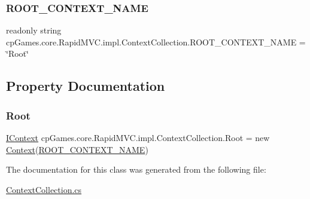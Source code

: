 \subsubsection{\texorpdfstring{ROOT\_CONTEXT\_NAME}{ROOT\_CONTEXT\_NAME}}
{\footnotesize\ttfamily readonly string cp\+Games.\+core.\+Rapid\+M\+V\+C.\+impl.\+Context\+Collection.\+R\+O\+O\+T\+\_\+\+C\+O\+N\+T\+E\+X\+T\+\_\+\+N\+A\+ME = \char`\"{}Root\char`\"{}\hspace{0.3cm}{\ttfamily [static]}}



\subsection{Property Documentation}
\mbox{\label{classcp_games_1_1core_1_1_rapid_m_v_c_1_1impl_1_1_context_collection_aa7ccaf9a5b00706a684a475c21928560}} 
\subsubsection{\texorpdfstring{Root}{Root}}
{\footnotesize\ttfamily \mbox{\hyperlink{interfacecp_games_1_1core_1_1_rapid_m_v_c_1_1_i_context}{I\+Context}} cp\+Games.\+core.\+Rapid\+M\+V\+C.\+impl.\+Context\+Collection.\+Root = new \mbox{\hyperlink{classcp_games_1_1core_1_1_rapid_m_v_c_1_1impl_1_1_context}{Context}}(\mbox{\hyperlink{classcp_games_1_1core_1_1_rapid_m_v_c_1_1impl_1_1_context_collection_a86300874483a67e28fba243d52f6e05a}{R\+O\+O\+T\+\_\+\+C\+O\+N\+T\+E\+X\+T\+\_\+\+N\+A\+ME}})\hspace{0.3cm}{\ttfamily [get]}}



The documentation for this class was generated from the following file\+:\begin{DoxyCompactItemize}
\item 
\mbox{\hyperlink{_context_collection_8cs}{Context\+Collection.\+cs}}\end{DoxyCompactItemize}
